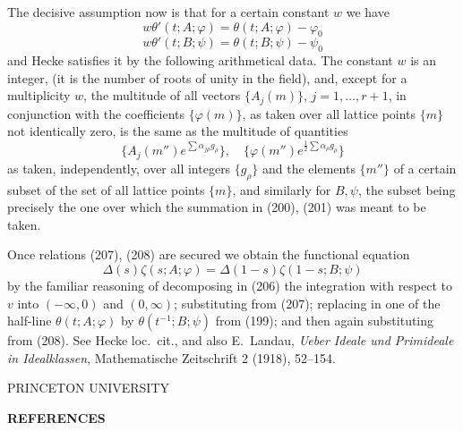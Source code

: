 \documentclass[12pt]{article}
\begin{document}
The decisive assumption now is that for a certain constant \(w\) we have
\begin{equation}
w \theta'(t; A; \varphi) = \theta(t; A; \varphi) - \varphi_0
\tag{207}
\end{equation}
\begin{equation}
w \theta'(t; B; \psi) = \theta(t; B; \psi) - \psi_0
\tag{208}
\end{equation}
and Hecke satisfies it by the following arithmetical data. The constant \(w\) is an integer, (it is the number of roots of unity in the field), and, except for a multiplicity \(w\), the multitude of all vectors \(\{A_j(m)\}\), \(j = 1, \dots, r + 1\), in conjunction with the coefficients \(\{\varphi(m)\}\), as taken over all lattice points \(\{m\}\) not identically zero, is the same as the multitude of quantities
\[
\{A_j(m'') e^{\sum \alpha_{j\rho} g_\rho}\}, \quad \{\varphi(m'') e^{\frac{1}{2} \sum \alpha_\rho g_\rho}\}
\]
as taken, independently, over all integers \(\{g_\rho\}\) and the elements \(\{m''\}\) of a certain subset of the set of all lattice points \(\{m\}\), and similarly for \(B, \psi\), the subset being precisely the one over which the summation in (200), (201) was meant to be taken.

Once relations (207), (208) are secured we obtain the functional equation
\[
\Delta(s) \zeta(s; A; \varphi) = \Delta(1 - s) \zeta(1 - s; B; \psi)
\]
by the familiar reasoning of decomposing in (206) the integration with respect to \(v\) into \((-\infty, 0)\) and \((0, \infty)\); substituting from (207); replacing in one of the half-line \(\theta(t; A; \varphi)\) by \(\theta(t^{-1}; B; \psi)\) from (199); and then again substituting from (208). See Hecke loc.~cit., and also E.~Landau, \emph{Ueber Ideale und Primideale in Idealklassen}, Mathematische Zeitschrift 2 (1918), 52–154.

\medskip

\noindent PRINCETON UNIVERSITY

\vspace{2em}

\noindent\textbf{REFERENCES}
\end{document}
